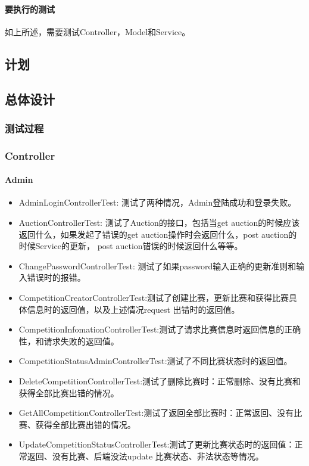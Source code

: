 \documentclass{article}
\begin{document}
\paragraph{要执行的测试}
	如上所述，需要测试Controller，Model和Service。
\subsection{计划}
\subsection{总体设计}
\subsubsection{测试过程}
	\subsubsection{Controller}
		\paragraph{Admin}
			\begin{itemize}
			\item AdminLoginControllerTest: 测试了两种情况，Admin登陆成功和登录失败。
			\item AuctionControllerTest: 测试了Auction的接口，包括当get auction的时候应该返回什么，如果发起了错误的get auction操作时会返回什么，post auction的时候Service的更新， post auction错误的时候返回什么等等。
			\item ChangePasswordControllerTest: 测试了如果password输入正确的更新准则和输入错误时的报错。
			\item CompetitionCreatorControllerTest:测试了创建比赛，更新比赛和获得比赛具体信息时的返回值，以及上述情况request 出错时的返回值。
			\item CompetitionInfomationControllerTest:测试了请求比赛信息时返回信息的正确性，和请求失败的返回值。
			\item CompetitionStatusAdminControllerTest:测试了不同比赛状态时的返回值。
			\item DeleteCompetitionControllerTest:测试了删除比赛时：正常删除、没有比赛和获得全部比赛出错的情况。
			\item GetAllCompetitionControllerTest:测试了返回全部比赛时：正常返回、没有比赛、获得全部比赛出错的情况。
			\item UpdateCompetitionStatusControllerTest:测试了更新比赛状态时的返回值：正常返回、没有比赛、后端没法update 比赛状态、非法状态等情况。
			\end{itemize}
\end{document}

